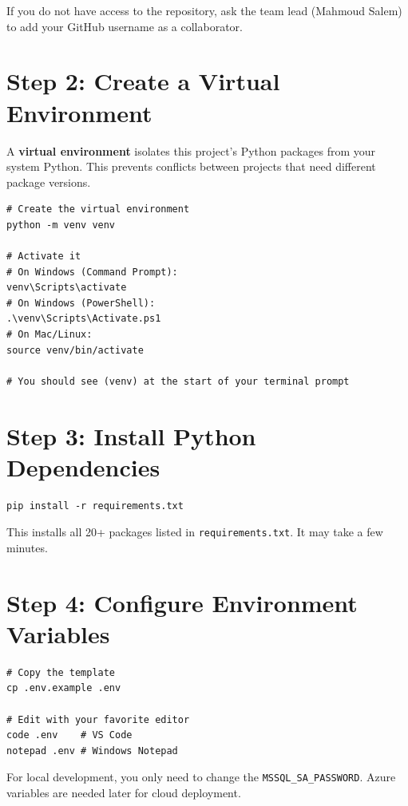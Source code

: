 \documentclass[12pt, a4paper, oneside]{report}
\begin{document}
\begin{notebox}
    If you do not have access to the repository, ask the team lead (Mahmoud Salem) to add your GitHub username as a collaborator.
\end{notebox}

\section{Step 2: Create a Virtual Environment}

A \textbf{virtual environment} isolates this project's Python packages from your system Python. This prevents conflicts between projects that need different package versions.

\begin{lstlisting}[style=bashstyle]
# Create the virtual environment
python -m venv venv

# Activate it
# On Windows (Command Prompt):
venv\Scripts\activate
# On Windows (PowerShell):
.\venv\Scripts\Activate.ps1
# On Mac/Linux:
source venv/bin/activate

# You should see (venv) at the start of your terminal prompt
\end{lstlisting}

\section{Step 3: Install Python Dependencies}

\begin{lstlisting}[style=bashstyle]
pip install -r requirements.txt
\end{lstlisting}

This installs all 20+ packages listed in \texttt{requirements.txt}. It may take a few minutes.

\section{Step 4: Configure Environment Variables}

\begin{lstlisting}[style=bashstyle]
# Copy the template
cp .env.example .env

# Edit with your favorite editor
code .env    # VS Code
notepad .env # Windows Notepad
\end{lstlisting}

For local development, you only need to change the \texttt{MSSQL\_SA\_PASSWORD}. Azure variables are needed later for cloud deployment.
\end{document}
